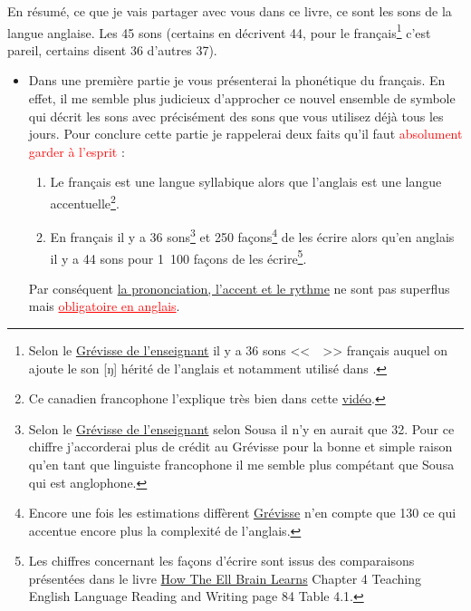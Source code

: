 En résumé, ce que je vais partager avec vous dans ce livre, ce
sont les sons de la langue anglaise. Les 45 sons (certains en
décrivent 44, pour le français\footnote{Selon le
  \href{https://www.amazon.fr/gp/product/221010632X/ref=as_li_tl?ie=UTF8&camp=1642&creative=6746&creativeASIN=221010632X&linkCode=as2&tag=wwwbecomefree-21&linkId=c8c522ee07ffc9188dd9a768e39d88e0}{Grévisse
  de l'enseignant} il y a 36 sons <<~~>> français
auquel on ajoute le son [ŋ] hérité de l'anglais et notamment utilisé dans .} c'est pareil, certains disent 36
d'autres 37).\par
\begin{itemize}
\item Dans une première partie je vous présenterai la phonétique du
français. En effet, il me semble plus judicieux d'approcher ce nouvel
ensemble de symbole qui décrit les sons avec précisément des sons que
vous utilisez déjà tous les jours.  Pour conclure cette partie je
rappelerai deux faits qu'il faut \textcolor{red}{absolument garder à l'esprit} :
\begin{enumerate}
\item Le français est une langue syllabique alors que l'anglais est
  une langue accentuelle\footnote{Ce canadien francophone l'explique
    très bien dans cette
    \href{https://youtu.be/EjVHGsRCf8M?t=4m45s}{vidéo}.}.
\item En français il y a 36 sons\footnote{Selon le
  \href{https://www.amazon.fr/gp/product/221010632X/ref=as_li_tl?ie=UTF8&camp=1642&creative=6746&creativeASIN=221010632X&linkCode=as2&tag=wwwbecomefree-21&linkId=c8c522ee07ffc9188dd9a768e39d88e0}{Grévisse
  de l'enseignant} selon Sousa il n'y en aurait que 32. Pour ce
chiffre j'accorderai plus de crédit au Grévisse pour la bonne et
simple raison qu'en tant que linguiste francophone il me semble plus
compétant que Sousa qui est anglophone.} et 250 façons\footnote{Encore une
fois les estimations diffèrent
\href{https://www.amazon.fr/gp/product/221010632X/ref=as_li_tl?ie=UTF8&camp=1642&creative=6746&creativeASIN=221010632X&linkCode=as2&tag=wwwbecomefree-21&linkId=c8c522ee07ffc9188dd9a768e39d88e0}{Grévisse}
n'en compte que 130 ce qui accentue encore plus la complexité de l'anglais.} de les écrire alors
  qu'en anglais il y a 44 sons pour 1~100 façons de les
  écrire\footnote{Les chiffres concernant les façons d'écrire sont
    issus des comparaisons présentées dans le livre
    \href{https://www.amazon.fr/gp/product/B00M0GDXN8/ref=as_li_tl?ie=UTF8&camp=1642&creative=6746&creativeASIN=B00M0GDXN8&linkCode=as2&tag=wwwbecomefree-21&linkId=e782cf430858413ec9135fcef1644b20}{How
      The Ell Brain Learns} Chapter 4 Teaching English Language
    Reading and Writing page 84 Table 4.1.}.
\end{enumerate}
Par conséquent \underline{la prononciation, l'accent et le rythme} ne sont pas
superflus mais \textcolor{red}{\underline{obligatoire en anglais}}.\par


\end{itemize}
